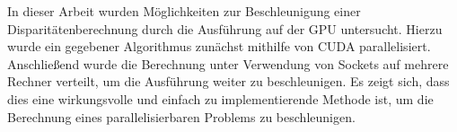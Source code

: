 \documentclass[times, 10pt,twocolumn]{article}
\begin{document}
In dieser Arbeit wurden Möglichkeiten zur Beschleunigung einer Disparitätenberechnung durch die Ausführung auf der GPU untersucht. Hierzu wurde ein gegebener Algorithmus zunächst mithilfe von CUDA parallelisiert. Anschließend wurde die Berechnung unter Verwendung von Sockets auf mehrere Rechner verteilt, um die Ausführung weiter zu beschleunigen. Es zeigt sich, dass dies eine wirkungsvolle und einfach zu implementierende Methode ist, um die Berechnung eines parallelisierbaren Problems zu beschleunigen.








\end{document}
